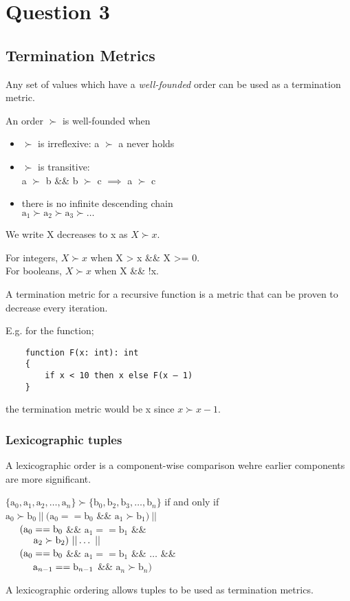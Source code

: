 \section{Question 3}
\subsection{Termination Metrics}
Any set of values which have a \textit{well-founded} order can be used as a termination metric.

An order $\succ$ is well-founded when
\begin{itemize}
    \item $\succ$ is irreflexive: a $\succ$ a never holds
    \item $\succ$ is transitive:\\
        \tab a $\succ$ b \&\& b $\succ$ c $\implies$ a $\succ$ c
    \item there is no infinite descending chain\\
        \tab $\text{a}_1 \succ \text{a}_2  \succ \text{a}_3  \succ \dots$
\end{itemize}

We write X decreases to x as $X \succ x$.

For integers, $X \succ x$ when X > x \&\& X >= 0. \\
For booleans, $X \succ x$ when X \&\& !x.

A termination metric for a recursive function is a metric that can be proven to decrease every iteration.

E.g. for the function;
\begin{verbatim}
    function F(x: int): int 
    { 
        if x < 10 then x else F(x – 1)
    }
\end{verbatim}
the termination metric would be x since $x \succ x - 1$.

\subsubsection{Lexicographic tuples}
A lexicographic order is a component-wise comparison wehre earlier components are more significant.

$\{\text{a}_0, \text{a}_1, \text{a}_2, \dots, \text{a}_n\} \succ \{\text{b}_0, \text{b}_2, \text{b}_3, \dots, \text{b}_n\}$ if and only if\\
$\text{a}_0 \succ \text{b}_0\ ||\ (\text{a}_0 == \text{b}_0$ \&\& $\text{a}_1 \succ \text{b}_1)\ ||$\\
$\hspace*{0.5cm} (\text{a}_0 == \text{b}_0$ \&\& $\text{a}_1 == \text{b}_1$ \&\&\\
$\tab \tab \text{a}_2 \succ \text{b}_2)\ || \dots\ ||$\\
$\hspace*{0.5cm} (\text{a}_0 == \text{b}_0$ \&\& $\text{a}_1 == \text{b}_1$ \&\& $\dots$ \&\&\\
$\tab \tab \text{a}_{n-1} == \text{b}_{n-1}$ \&\& $\text{a}_n \succ \text{b}_n)$

A lexicographic ordering allows tuples to be used as termination metrics. 
